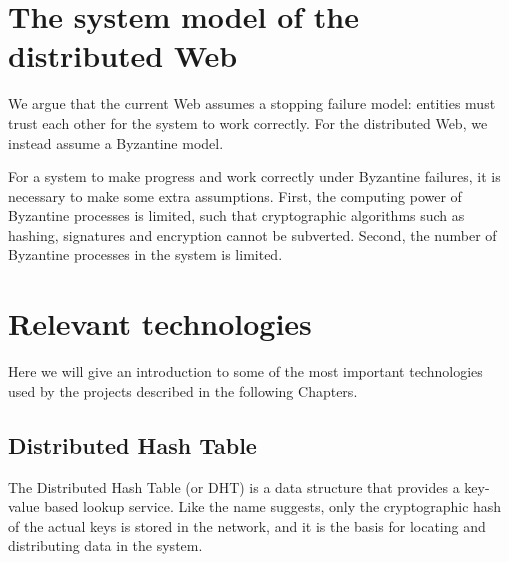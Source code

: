 \documentclass[mscthesis]{usiinfthesis}
\begin{document}
\section{The system model of the distributed Web}\label{sec:model}
We argue that the current Web assumes a stopping failure model: entities must trust each other for the system to work correctly.
For the distributed Web, we instead assume a Byzantine model.

For a system to make progress and work correctly under Byzantine failures, it is necessary to make some extra assumptions.
First, the computing power of Byzantine processes is limited, such that cryptographic algorithms such as hashing, signatures and encryption cannot be subverted.
Second, the number of Byzantine processes in the system is limited. %


 
\section{Relevant technologies}

Here we will give an introduction to some of the most important technologies used by the projects described in the following Chapters.

\subsection{Distributed Hash Table}\label{tech:dht}

The Distributed Hash Table (or DHT) is a data structure that provides a key-value based lookup service. Like the name suggests, only the cryptographic hash of the actual keys is stored in the network, and it is the basis for locating and distributing data in the system.
\end{document}

